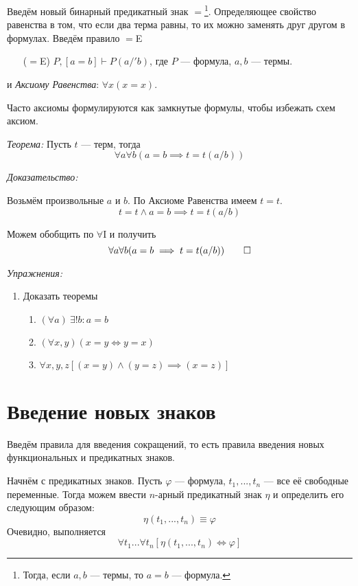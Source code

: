 Введём новый бинарный предикатный знак $=$\footnote{
	Тогда, если $a,b$	 --- термы, то $a=b$ --- формула.
}.
Определяющее свойство равенства в том, что если два терма равны, то их можно
заменять друг другом в формулах. Введём правило $=$E
\begin{enumerate}
	\item[($=$E)]{}$P,[a=b]\vdash P(a/'b)$,
	где $P$ --- формула, $a,b$ --- термы.
\end{enumerate}
и {\it Аксиому Равенства}: $\forall x(x=x)$.

Часто аксиомы формулируются как замкнутые формулы, чтобы избежать схем аксиом.

\vspace{1em}
{\it Теорема:} Пусть $t$ --- терм, тогда
\[
	\forall a\forall b(a=b\implies t=t(a/b))
\]

{\it Доказательство:}

Возьмём произвольные $a$ и $b$. По Аксиоме Равенства имеем $t=t$.
\[
	t=t\land a=b\implies t=t(a/b)
\]

Можем обобщить по $\forall$I и получить
\[
	\forall a\forall b(a=b\implies t=t(a/b))
	\qed
\]

\vspace{1em}
{\it Упражнения:}
\begin{enumerate}
	\item{}Доказать теоремы
	\begin{enumerate}
		\item{}$(\forall a)~\exists! b:a=b$
		\item{}$(\forall x,y)(x=y\iff y=x)$
		\item{}$\forall x,y,z[(x=y)\land (y=z)\implies (x=z)]$
	\end{enumerate}
\end{enumerate}

\section{Введение новых знаков}

Введём правила для введения сокращений, то есть правила введения новых функциональных
и предикатных знаков.

Начнём с предикатных знаков. Пусть $\varphi$ --- формула, $t_1,...,t_{n}$ --- все её
свободные переменные. Тогда можем ввести $n$-арный предикатный знак $\eta$
и определить его следующим образом:
\[
	\eta(t_1,...,t_{n})\equiv \varphi
\]
Очевидно, выполняется
\[
	\forall t_1...\forall t_{n}[\eta(t_1,...,t_{n})\iff\varphi]
\]

